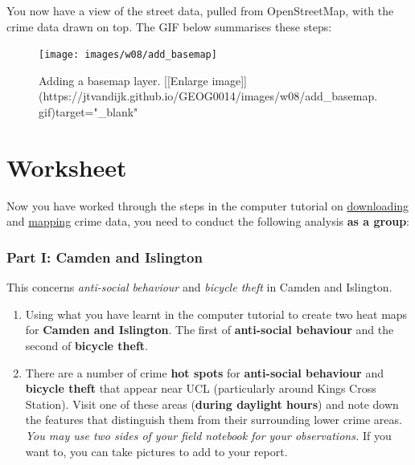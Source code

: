 \documentclass[
]{book}
\providecommand{\tightlist}{%
  \setlength{\itemsep}{0pt}\setlength{\parskip}{0pt}}
\begin{document}
You now have a view of the street data, pulled from OpenStreetMap, with the crime data drawn on top. The GIF below summarises these steps:

\begin{figure}

{\centering \texttt{[image: images/w08/add\_basemap]} 

}

\caption{Adding a basemap layer. [[Enlarge image]](https://jtvandijk.github.io/GEOG0014/images/w08/add_basemap.gif){target="_blank"}}\label{fig:adding-basemap}
\end{figure}

\hypertarget{worksheet}{%
\section*{Worksheet}\label{worksheet}}

Now you have worked through the steps in the computer tutorial on \protect\hyperlink{downloading-crime-data}{downloading} and \protect\hyperlink{mapping-crime-data}{mapping} crime data, you need to conduct the following analysis \textbf{as a group}:

\hypertarget{part-i-camden-and-islington}{%
\subsubsection*{Part I: Camden and Islington}\label{part-i-camden-and-islington}}

This concerns \emph{anti-social behaviour} and \emph{bicycle theft} in Camden and Islington.

\begin{enumerate}
\def\labelenumi{\arabic{enumi}.}
\tightlist
\item
  Using what you have learnt in the computer tutorial to create two heat maps for \textbf{Camden and Islington}. The first of \textbf{anti-social behaviour} and the second of \textbf{bicycle theft}.
\item
  There are a number of crime \textbf{hot spots} for \textbf{anti-social behaviour} and \textbf{bicycle theft} that appear near UCL (particularly around Kings Cross Station). Visit one of these areas (\textbf{during daylight hours}) and note down the features that distinguish them from their surrounding lower crime areas. \emph{You may use two sides of your field notebook for your observations.} If you want to, you can take pictures to add to your report.
\end{enumerate}
\end{document}
